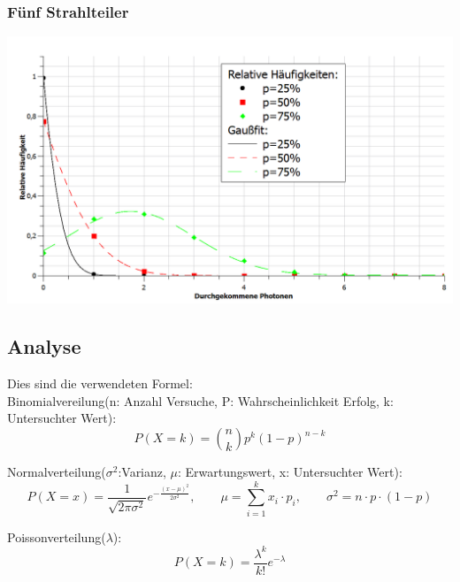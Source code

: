 \subsubsection{Fünf Strahlteiler}

\begin{center}
	\includegraphics{IMAGE/5ST}
\end{center}

\subsection{Analyse}
 
 Dies sind die verwendeten Formel:\\
 
 Binomialvereilung(n: Anzahl Versuche, P: Wahrscheinlichkeit Erfolg, k: Untersuchter Wert):\\
\begin{equation*}
 	P(X= k) = \binom{n}{k}p^k(1-p)^{n-k}
\end{equation*}

Normalverteilung($\sigma^2$:Varianz, $\mu$: Erwartungswert, x: Untersuchter Wert):\\
\begin{equation*}
	P(X= x) = \frac{1}{\sqrt{2\pi\sigma^2}}e^{-\frac{(x-\mu)^2}{2\sigma^2}},\qquad \mu = \sum_{i=1}^k x_i\cdot p_i, \qquad \sigma^2 = n\cdot p \cdot(1-p)
\end{equation*}

Poissonverteilung($\lambda$):\\
\begin{equation*}
	P(X=k)= \frac{\lambda^k}{k!}e^{-\lambda}
\end{equation*}


